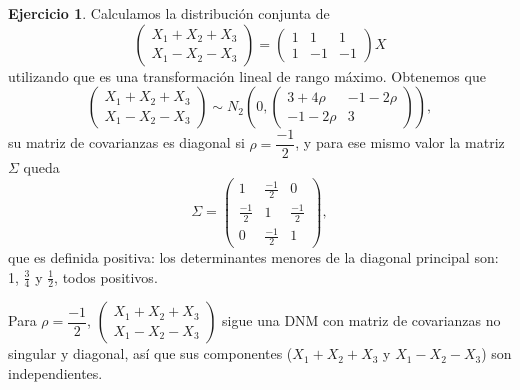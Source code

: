 \documentclass[12pt,spanish]{article}
\theoremstyle{definition}
\newtheorem{exercise}{Ejercicio}
\begin{document}
\begin{exercise} %
  Calculamos la distribución conjunta de
  \[
    \begin{pmatrix}
      X_1+X_2+X_3 \\
      X_1-X_2-X_3 
    \end{pmatrix}=
    \begin{pmatrix}
      1 & 1 & 1 \\
      1 & -1 & -1 
    \end{pmatrix}X
  \]
  utilizando que es una transformación lineal de rango máximo.
  Obtenemos que \[
    \begin{pmatrix}
      X_1+X_2+X_3 \\
      X_1-X_2-X_3 
    \end{pmatrix}\sim N_2\left(
      0,
      \begin{pmatrix}
        3+4\rho & -1-2\rho\\
        -1-2\rho & 3
      \end{pmatrix}
    \right),
  \]
  su matriz de covarianzas es diagonal si $\rho=\dfrac{-1}{2}$, y
  para ese mismo valor la matriz $\Sigma$ queda
  \[\Sigma=
    \begin{pmatrix}
      1 & \frac{-1}{2} & 0 \\
      \frac{-1}{2} & 1 & \frac{-1}{2} \\
      0 & \frac{-1}{2} & 1
    \end{pmatrix},
  \] que es definida positiva: los determinantes menores de la
  diagonal principal son: 1, $\frac{3}{4}$ y $\frac{1}{2}$, todos
  positivos.

  Para $\rho=\dfrac{-1}{2}$, $\begin{pmatrix}
    X_1+X_2+X_3 \\
    X_1-X_2-X_3 
  \end{pmatrix}$ sigue una DNM con matriz de covarianzas no
  singular y diagonal, así que sus componentes ($X_1+X_2+X_3$
  y $X_1-X_2-X_3$) son independientes.
\end{exercise}
\end{document}
